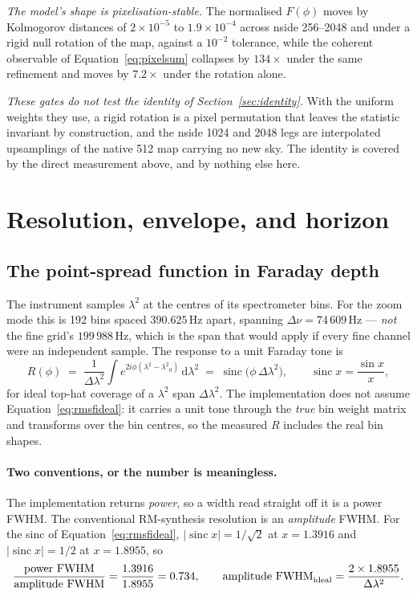 \documentclass[11pt]{article}
\newcommand{\lamsq}{\ensuremath{\lambda^{2}}}
\begin{document}
\emph{The model's shape is pixelisation-stable.} The normalised
$F(\phi)$ moves by Kolmogorov distances of $2\times10^{-5}$ to
$1.9\times10^{-4}$ across nside 256--2048 and under a rigid null
rotation of the map, against a $10^{-2}$ tolerance, while the coherent
observable of Equation~\eqref{eq:pixelsum} collapses by $134\times$
under the same refinement and moves by $7.2\times$ under the rotation
alone.

\emph{These gates do not test the identity of
Section~\ref{sec:identity}.} With the uniform weights they use, a rigid
rotation is a pixel permutation that leaves the statistic invariant by
construction, and the nside 1024 and 2048 legs are interpolated
upsamplings of the native 512 map carrying no new sky. The identity is
covered by the direct measurement above, and by nothing else here.

\section{Resolution, envelope, and horizon}
\label{sec:resolution}

\subsection{The point-spread function in Faraday depth}
\label{sec:rmsf}

The instrument samples \lamsq{} at the centres of its spectrometer bins.
For the zoom mode this is 192 bins spaced $390.625$\,Hz apart, spanning
$\Delta\nu = 74\,609$\,Hz --- \emph{not} the fine grid's
$199\,988$\,Hz, which is the span that would apply if every fine channel
were an independent sample. The response to a unit Faraday tone is
\begin{equation}
  R(\phi) \;=\; \frac{1}{\Delta\lamsq}
  \int e^{2i\phi(\lamsq - \lamsq_0)}\, \mathrm d\lamsq
  \;=\; \operatorname{sinc}\!\bigl(\phi\,\Delta\lamsq\bigr),
  \qquad \operatorname{sinc}x = \frac{\sin x}{x},
  \label{eq:rmsfideal}
\end{equation}
for ideal top-hat coverage of a \lamsq{} span $\Delta\lamsq$. The
implementation does not assume Equation~\eqref{eq:rmsfideal}: it carries
a unit tone through the \emph{true} bin weight matrix and transforms over
the bin centres, so the measured $R$ includes the real bin shapes.

\paragraph{Two conventions, or the number is meaningless.} The
implementation returns \emph{power}, so a width read straight off it is a
power FWHM. The conventional RM-synthesis resolution is an
\emph{amplitude} FWHM. For the sinc of Equation~\eqref{eq:rmsfideal},
$|\operatorname{sinc}x| = 1/\sqrt2$ at $x = 1.3916$ and
$|\operatorname{sinc}x| = 1/2$ at $x = 1.8955$, so
\begin{equation}
  \frac{\text{power FWHM}}{\text{amplitude FWHM}}
  = \frac{1.3916}{1.8955} = 0.734 ,
  \qquad
  \text{amplitude FWHM}_{\rm ideal} = \frac{2 \times 1.8955}{\Delta\lamsq}.
  \label{eq:conventions}
\end{equation}
\end{document}
